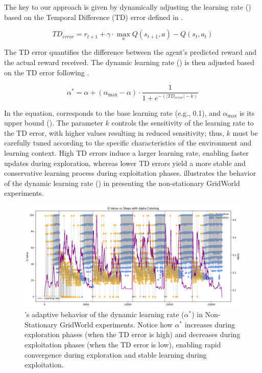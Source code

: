 The key to our approach is given by dynamically adjusting the learning rate (\lrate{\alpha}) based on 
the Temporal Difference (TD) error defined in .

\begin{equation} \label{eq:td_error}
    TD_{error} = r_{t+1} + \gamma \cdot \underset{a}{\max} Q(s_{t+1}, a) - Q(s_t, a_t)
\end{equation}

The TD error quantifies the difference between the agent's predicted reward and the actual reward 
received. The dynamic learning rate (\lrate{\alpha^*}) is then adjusted based on the TD error following  
.

\begin{equation}
    \label{eq:dynamic_learning_rate}
    \alpha^* = \alpha + (\alpha_{\max}-\alpha) \cdot \frac{1}{1 + e^{-(|TD_{error}|-k)}}
\end{equation}

In the equation, \lrate{\alpha} corresponds to the base learning rate (e.g., 0.1), and $\alpha_{\max}$ is its upper bound (). The parameter $k$ controls the sensitivity of the learning rate to the TD error, with higher values resulting in reduced sensitivity; thus, $k$ must be carefully tuned according to the specific characteristics of the environment and learning context. High TD errors induce a larger learning rate, enabling faster updates during exploration, whereas lower TD errors yield a more stable and conservative learning process during exploitation phases.  illustrates the behavior of the dynamic learning rate (\lrate{\alpha^*}) in  presenting the non-stationary GridWorld experiments. 

\begin{figure}
    \centering
    \includegraphics[width=\textwidth]{figures/alpha.png}
    \caption{\adaptiverl's adaptive behavior of the dynamic learning rate ($\alpha^*$) in Non-Stationary GridWorld experiments. Notice how $\alpha^*$ increases during exploration phases (when the TD error is high) and decreases during exploitation phases (when the TD error is low), enabling rapid convergence during exploration and stable learning during exploitation.}
    \label{fig:alpha}
\end{figure}

